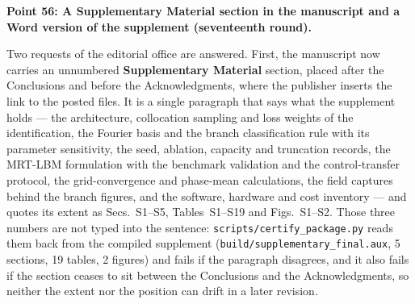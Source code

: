 \documentclass[11pt,a4paper]{article}
\begin{document}
\vspace{1em}

\noindent\textbf{Point 56: A Supplementary Material section in the manuscript and a
Word version of the supplement (seventeenth round).}

Two requests of the editorial office are answered. First, the manuscript now carries
an unnumbered \textbf{Supplementary Material} section, placed after the Conclusions
and before the Acknowledgments, where the publisher inserts the link to the posted
files. It is a single paragraph that says what the supplement holds --- the
architecture, collocation sampling and loss weights of the identification, the
Fourier basis and the branch classification rule with its parameter sensitivity, the
seed, ablation, capacity and truncation records, the MRT-LBM formulation with the
benchmark validation and the control-transfer protocol, the grid-convergence and
phase-mean calculations, the field captures behind the branch figures, and the
software, hardware and cost inventory --- and quotes its extent as Secs.~S1--S5,
Tables~S1--S19 and Figs.~S1--S2. Those three numbers are not typed into the sentence:
\texttt{scripts/}\hspace{0pt}\texttt{certify\_package.py} reads them back from the
compiled supplement (\texttt{build/}\hspace{0pt}\texttt{supplementary\_final.aux},
5 sections, 19 tables, 2 figures) and fails if the paragraph disagrees, and it also
fails if the section ceases to sit between the Conclusions and the Acknowledgments, so
neither the extent nor the position can drift in a later revision.
\end{document}
